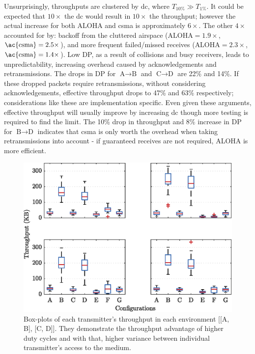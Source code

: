 Unsurprisingly, throughputs are clustered by \ac{dc}, where $T_{10\%} \gg  T_{1\%}$. It could be expected that $10\times $ the \ac{dc} would result in $10\times $ the throughput; however the actual increase for both ALOHA and \ac{csma} is approximately $ 6\times$. The other $4\times $ accounted for by: backoff from the cluttered airspace ($\text{ALOHA}=1.9\times $, $\text{\ac{csma}}=2.5\times$), and more frequent failed/missed receives ($\text{ALOHA}=2.3\times $, $\text{\ac{csma}}=1.4\times$). Low DP, as a result of collisions and busy receivers, leads to unpredictability, increasing overhead caused by acknowledgements and retransmissions. The drops in DP for $\text{A}\rightarrow \text{B}$ and $\text{C}\rightarrow \text{D}$ are 22\% and 14\%. If these dropped packets require retransmissions, without considering acknowledgements, effective throughput drops to 47\% and 63\% respectively; considerations like these are implementation specific. Even given these arguments, effective throughput will usually improve by increasing \ac{dc} though more testing is required to find the limit. The 10\% drop in throughput and 8\% increase in DP for $\text{B}\rightarrow \text{D}$ indicates that \ac{csma} is only worth the overhead when taking retransmissions into account - if guaranteed receives are not required, ALOHA is more efficient.
\vspace{10mm}
\begin{figure}[H]
    \centering
   	\includegraphics{Figures/sim_throughput_boxplots}
    \caption[Box-plots of protocol transmitter throughput]{
    	Box-plots of each transmitter's throughput in each environment [[A, B], [C, D]]. They demonstrate the throughput advantage of higher duty cycles and with that, higher variance between individual transmitter's access to the medium.}
    \label{fig:sim_throughput_boxplots}
\end{figure}

